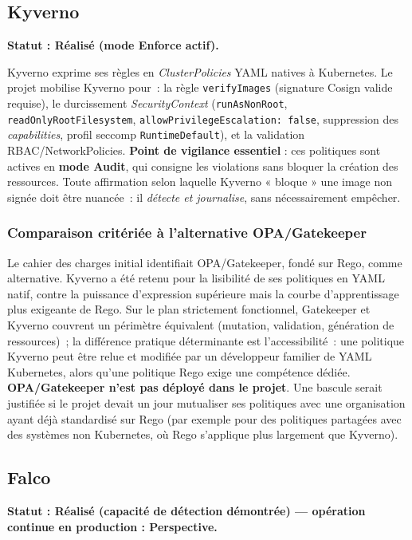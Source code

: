 \subsection{Kyverno}
\textbf{Statut : Réalisé (mode Enforce actif).}

Kyverno exprime ses règles en \textit{ClusterPolicies} YAML natives à Kubernetes. Le projet mobilise Kyverno pour~: la règle \texttt{verifyImages} (signature Cosign valide requise), le durcissement \textit{SecurityContext} (\texttt{runAsNonRoot}, \texttt{readOnlyRootFilesystem}, \texttt{allowPrivilegeEscalation: false}, suppression des \textit{capabilities}, profil seccomp \texttt{RuntimeDefault}), et la validation RBAC/NetworkPolicies. \textbf{Point de vigilance essentiel} : ces politiques sont actives en \textbf{mode Audit}, qui consigne les violations sans bloquer la création des ressources. Toute affirmation selon laquelle Kyverno « bloque » une image non signée doit être nuancée~: il \textit{détecte et journalise}, sans nécessairement empêcher.

\subsubsection{Comparaison critériée à l'alternative OPA/Gatekeeper}
Le cahier des charges initial identifiait OPA/Gatekeeper, fondé sur Rego, comme alternative. Kyverno a été retenu pour la lisibilité de ses politiques en YAML natif, contre la puissance d'expression supérieure mais la courbe d'apprentissage plus exigeante de Rego. Sur le plan strictement fonctionnel, Gatekeeper et Kyverno couvrent un périmètre équivalent (mutation, validation, génération de ressources)~; la différence pratique déterminante est l'accessibilité~: une politique Kyverno peut être relue et modifiée par un développeur familier de YAML Kubernetes, alors qu'une politique Rego exige une compétence dédiée. \textbf{OPA/Gatekeeper n'est pas déployé dans le projet}. Une bascule serait justifiée si le projet devait un jour mutualiser ses politiques avec une organisation ayant déjà standardisé sur Rego (par exemple pour des politiques partagées avec des systèmes non Kubernetes, où Rego s'applique plus largement que Kyverno).

\subsection{Falco}
\textbf{Statut : Réalisé (capacité de détection démontrée) — opération continue en production : Perspective.}

